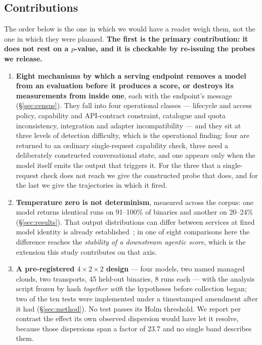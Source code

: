 \subsection{Contributions}

The order below is the one in which we would have a reader weigh them, not the one in which they were
planned. \textbf{The first is the primary contribution: it does not rest on a $p$-value, and it is
checkable by re-issuing the probes we release.}

\begin{enumerate}
\item \textbf{Eight mechanisms by which a serving endpoint removes a model from an evaluation before it
  produces a score, or destroys its measurements from inside one}, each with the endpoint's message
  (\S\ref{sec:census}). They fall into four operational classes --- lifecycle and access policy,
  capability and API-contract constraint, catalogue and quota inconsistency, integration and adapter
  incompatibility --- and they sit at three levels of detection difficulty, which is the operational
  finding: four are returned to an ordinary single-request capability check, three need a deliberately
  constructed conversational state, and one appears only when the model itself emits the output that
  triggers it. For the three that a single-request check does not reach we give the constructed probe that
  does, and for the last we give the trajectories in which it fired.
\item \textbf{Temperature zero is not determinism}, measured across the corpus: one model returns
  identical runs on 91--100\% of binaries and another on 20--24\% (\S\ref{sec:results}). That output
  distributions can differ between services at fixed model identity is already
  established~\citep{gao2025equality}; in one of eight comparisons here the difference reaches the
  \emph{stability of a downstream agentic score}, which is the extension this study contributes on that
  axis.
\item \textbf{A pre-registered $4\times2\times2$ design} --- four models, two named managed clouds, two
  transports, 45 held-out binaries, 8 runs each --- with the analysis script frozen by hash
  \emph{together with} the hypotheses before collection began; two of the ten tests were implemented
  under a timestamped amendment after it had (\S\ref{sec:method}). No test passes its Holm threshold.
  We report per contrast the effect its own observed dispersion would have let it resolve, because those
  dispersions span a factor of 23.7 and no single band describes them.

\end{enumerate}
